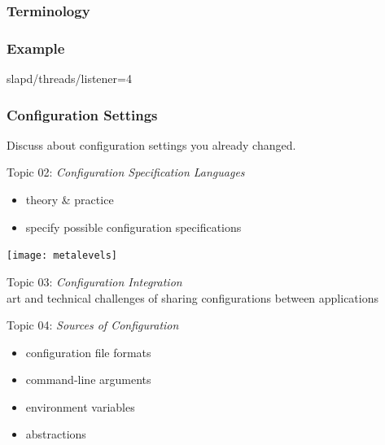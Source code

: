 \begin{frame}
	\frametitle{Terminology}
	
\end{frame}

\begin{frame}[fragile]
	\frametitle{Example}

	\begin{code}[language=CfgElektra]
	slapd/threads/listener=4
	\end{code}
\end{frame}

\begin{assignment}
	\frametitle{Configuration Settings}
	\begin{task}
	Discuss about configuration settings you already changed.
	\end{task}
\end{assignment}

\begin{frame}
	Topic 02: \textit{Configuration Specification Languages}
	\begin{itemize}
		\item theory \& practice
		\item specify possible configuration specifications
	\end{itemize}
	\vspace{0.5cm}
	\texttt{[image: metalevels]}
\end{frame}

\begin{frame}
	Topic 03: \textit{Configuration Integration}
	\\ \vspace{1cm}
	art and technical challenges of sharing configurations between applications
\end{frame}


\begin{frame}
	Topic 04: \textit{Sources of Configuration}
	\begin{itemize}
		\item configuration file formats
		\item command-line arguments
		\item environment variables
		\item abstractions
	\end{itemize}
\end{frame}

